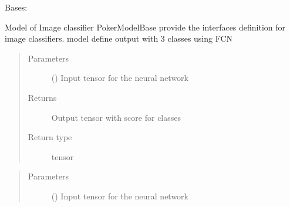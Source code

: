 \documentclass[letterpaper,10pt,english]{sphinxmanual}
\begin{document}
\begin{fulllineitems}
\label{\detokenize{models:models.FCN3.model}}
\pysigstartsignatures
{}
\pysigstopsignatures
\sphinxAtStartPar
Bases: {\hyperref[\detokenize{models:models.base_model.PokerModelBase}]{}}

\sphinxAtStartPar
Model of Image classifier
PokerModelBase provide the interfaces definition for image classifiers.
model define output with 3 classes using FCN

\begin{fulllineitems}
\label{\detokenize{models:models.FCN3.model.forward}}
\pysigstartsignatures
{}
\pysigstopsignatures\begin{quote}\begin{description}
\item[{Parameters}] \leavevmode
\sphinxAtStartPar
{} () \textendash{} Input tensor for the neural network

\item[{Returns}] \leavevmode
\sphinxAtStartPar
{} \textendash{} Output tensor with score for classes

\item[{Return type}] \leavevmode
\sphinxAtStartPar
tensor

\end{description}\end{quote}

\end{fulllineitems}


\begin{fulllineitems}
\label{\detokenize{models:models.FCN3.model.predict}}
\pysigstartsignatures
{}
\pysigstopsignatures\begin{quote}\begin{description}
\item[{Parameters}] \leavevmode
\sphinxAtStartPar
{} () \textendash{} Input tensor for the neural network


\end{description}
\end{quote}
\end{fulllineitems}
\end{fulllineitems}
\end{document}
